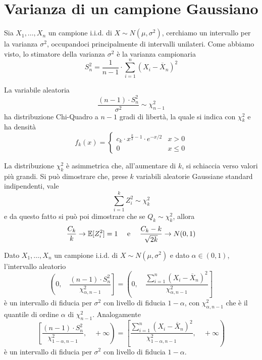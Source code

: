 \section{Varianza di un campione Gaussiano}
Sia $X_1, \dots, X_n$ un campione i.i.d. di $X \sim N(\mu, \sigma^2)$, cerchiamo un intervallo
per la varianza $\sigma^2$, occupandoci principalmente di intervalli unilateri. Come abbiamo visto,
lo stimatore della varianza $\sigma^2$ è la varianza campionaria
\[ S_n^2 = \frac{1}{n-1} \cdot \sum_{i=1}^n (X_i - \overline{X}_n)^2 \]

\begin{proposition}
	La variabile aleatoria
	\[ \frac{(n-1) \cdot S_n^2}{\sigma^2} \sim \chi_{n-1}^2 \]
	ha distribuzione Chi-Quadro a $n-1$ gradi di libertà, la quale si indica con $\chi_k^2$ e
	ha densità
	\[
		f_k(x) = \begin{cases}
			c_k \cdot x^{\frac{k}{2} - 1} \cdot e^{-x/2} & x > 0    \\
			0                                            & x \leq 0
		\end{cases}
	\]
\end{proposition}

La distribuzione $\chi_k^2$ è asimmetrica che, all'aumentare di $k$, si schiaccia verso valori più
grandi. Si può dimostrare che, prese $k$ variabili aleatorie Gaussiane standard indipendenti, vale
\[ \sum_{i=1}^k Z_i^2 \sim \chi_k^2 \]
e da questo fatto si può poi dimostrare che se $Q_k \sim \chi_k^2$, allora
\[ \frac{C_k}{k} \to \mathbb{E}[Z_i^2] = 1 \quad \text{ e } \quad \frac{C_k - k}{\sqrt{2k}} \to N(0, 1) \]

\begin{proposition}
	Dato $X_1, \dots, X_n$ un campione i.i.d. di $X \sim N(\mu, \sigma^2)$ e dato $\alpha \in (0,1)$,
	l'intervallo aleatorio
	\begin{equation*}
		\left( 0, \quad \frac{(n-1) \cdot S_n^2}{\chi_{\alpha, n-1}^2} \right] =
		\left( 0, \quad \frac{\sum_{i=1}^n (X_i - \overline{X}_n)^2}{\chi_{\alpha, n-1}^2} \right]
	\end{equation*}
	è un intervallo di fiducia per $\sigma^2$ con livello di fiducia $1-\alpha$, con
	$\chi_{\alpha, n-1}^2$ che è il quantile di ordine $\alpha$ di $\chi_{n-1}^2$. Analogamente
	\begin{equation*}
		\left[ \frac{(n-1) \cdot S_n^2}{\chi_{1-\alpha, n-1}^2}, \quad +\infty \right) =
		\left[ \frac{\sum_{i=1}^n (X_i - \overline{X}_n)^2}{\chi_{1-\alpha, n-1}^2}, \quad +\infty \right)
	\end{equation*}
	è un intervallo di fiducia per $\sigma^2$ con livello di fiducia $1-\alpha$.
\end{proposition}